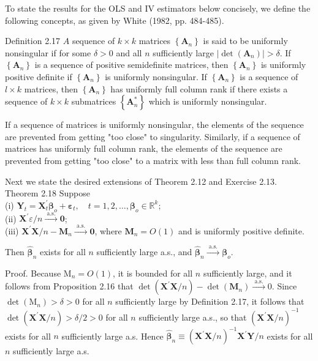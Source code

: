 \documentclass[10pt]{article}
\begin{document}
To state the results for the OLS and IV estimators below concisely, we define the following concepts, as given by White (1982, pp. 484-485).

Definition 2.17 $A$ sequence of $k \times k$ matrices $\left\{\mathbf{A}_{n}\right\}$ is said to be uniformly nonsingular if for some $\delta>0$ and all $n$ sufficiently large $\left|\operatorname{det}\left(\mathbf{A}_{n}\right)\right|> \delta$. If $\left\{\mathbf{A}_{n}\right\}$ is a sequence of positive semidefinite matrices, then $\left\{\mathbf{A}_{n}\right\}$ is uniformly positive definite if $\left\{\mathbf{A}_{n}\right\}$ is uniformly nonsingular. If $\left\{\mathbf{A}_{n}\right\}$ is a sequence of $l \times k$ matrices, then $\left\{\mathbf{A}_{n}\right\}$ has uniformly full column rank if there exists a sequence of $k \times k$ submatrices $\left\{\mathbf{A}_{n}^{*}\right\}$ which is uniformly nonsingular.

If a sequence of matrices is uniformly nonsingular, the elements of the sequence are prevented from getting "too close" to singularity. Similarly, if a sequence of matrices has uniformly full column rank, the elements of the sequence are prevented from getting "too close" to a matrix with less than full column rank.

Next we state the desired extensions of Theorem 2.12 and Exercise 2.13.\\
Theorem 2.18 Suppose\\
(i) $\mathbf{Y}_{t}=\mathbf{X}_{t}^{\prime} \boldsymbol{\beta}_{o}+\boldsymbol{\varepsilon}_{t}, \quad t=1,2, \ldots, \boldsymbol{\beta}_{o} \in \mathbb{R}^{k} ;$\\
(ii) $\mathbf{X}^{\prime} \varepsilon / n \xrightarrow{\text { a.s. }} \mathbf{0}$;\\
(iii) $\mathbf{X}^{\prime} \mathbf{X} / n-\mathbf{M}_{n} \xrightarrow{\text { a.s. }} \mathbf{0}$, where $\mathbf{M}_{n}=O(1)$ and is uniformly positive definite.

Then $\hat{\boldsymbol{\beta}}_{n}$ exists for all $n$ sufficiently large a.s., and $\hat{\boldsymbol{\beta}}_{n} \xrightarrow{\text { a.s. }} \boldsymbol{\beta}_{o}$.

Proof. Because $\mathrm{M}_{n}=O(1)$, it is bounded for all $n$ sufficiently large, and it follows from Proposition 2.16 that $\operatorname{det}\left(\mathbf{X}^{\prime} \mathbf{X} / n\right)-\operatorname{det}\left(\mathbf{M}_{n}\right) \xrightarrow{\text { a.s. }} 0$. Since $\operatorname{det}\left(\mathrm{M}_{n}\right)>\delta>0$ for all $n$ sufficiently large by Definition 2.17, it follows that $\operatorname{det}\left(\mathbf{X}^{\prime} \mathbf{X} / n\right)>\delta / 2>0$ for all $n$ sufficiently large a.s., so that $\left(\mathbf{X}^{\prime} \mathbf{X} / n\right)^{-1}$ exists for all $n$ sufficiently large a.s. Hence $\hat{\boldsymbol{\beta}}_{n} \equiv \left(\mathbf{X}^{\prime} \mathbf{X} / n\right)^{-1} \mathbf{X}^{\prime} \mathbf{Y} / n$ exists for all $n$ sufficiently large a.s.
\end{document}
